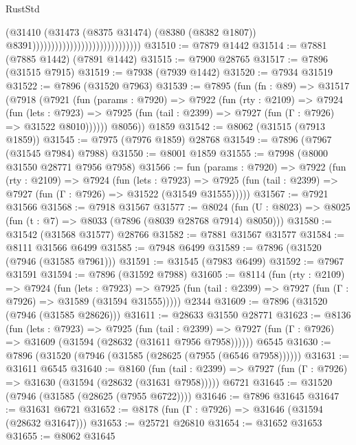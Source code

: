 \begin{lexlean}{RustStd}
\begin{coremodule}
                                                          (@31410
                                                            (@31473
                                                              (@8375 @31474)
                                                              (@8380 (@8382 @1807))
                                                              @8391)))))))))))))))))))))))))))))
@31510 := @7879 @1442
@31514 := @7881 (@7885 @1442) (@7891 @1442)
@31515 := @7900 @28765
@31517 := @7896 (@31515 @7915)
@31519 := @7938 (@7939 @1442)
@31520 := @7934 @31519
@31522 := @7896 (@31520 @7963)
@31539 := @7895
    (fun (fn : @89) =>
    @31517
      (@7918
        (@7921
          (fun (params : @7920) =>
          @7922
            (fun (rty : @2109) =>
            @7924
              (fun (lets : @7923) =>
              @7925 (fun (tail : @2399) => @7927 (fun (Γ : @7926) => @31522 @8010))))))
        @8056))
    @1859
@31542 := @8062 (@31515 (@7913 @1859))
@31545 := @7975 (@7976 @1859) @28768
@31549 := @7896 (@7967 (@31545 @7984) @7988)
@31550 := @8001 @1859
@31555 := @7998 (@8000 @31550 @28771 @7956 @7958)
@31566 := fun (params : @7920) =>
  @7922
    (fun (rty : @2109) =>
    @7924
      (fun (lets : @7923) =>
      @7925 (fun (tail : @2399) => @7927 (fun (Γ : @7926) => @31522 (@31549 @31555)))))
@31567 := @7921 @31566
@31568 := @7918 @31567
@31577 := @8024
    (fun (U : @8023) => @8025 (fun (t : @7) => @8033 (@7896 (@8039 @28768 @7914) @8050)))
@31580 := @31542 (@31568 @31577) @28766
@31582 := @7881 @31567 @31577
@31584 := @8111 @31566 @6499
@31585 := @7948 @6499
@31589 := @7896 (@31520 (@7946 (@31585 @7961)))
@31591 := @31545 (@7983 @6499)
@31592 := @7967 @31591
@31594 := @7896 (@31592 @7988)
@31605 := @8114
    (fun (rty : @2109) =>
    @7924
      (fun (lets : @7923) =>
      @7925 (fun (tail : @2399) => @7927 (fun (Γ : @7926) => @31589 (@31594 @31555)))))
    @2344
@31609 := @7896 (@31520 (@7946 (@31585 @28626)))
@31611 := @28633 @31550 @28771
@31623 := @8136
    (fun (lets : @7923) =>
    @7925
      (fun (tail : @2399) =>
      @7927 (fun (Γ : @7926) => @31609 (@31594 (@28632 (@31611 @7956 @7958))))))
    @6545
@31630 := @7896 (@31520 (@7946 (@31585 (@28625 (@7955 (@6546 @7958))))))
@31631 := @31611 @6545
@31640 := @8160
    (fun (tail : @2399) => @7927 (fun (Γ : @7926) => @31630 (@31594 (@28632 (@31631 @7958)))))
    @6721
@31645 := @31520 (@7946 (@31585 (@28625 (@7955 @6722))))
@31646 := @7896 @31645
@31647 := @31631 @6721
@31652 := @8178 (fun (Γ : @7926) => @31646 (@31594 (@28632 @31647)))
@31653 := @25721 @26810
@31654 := @31652 @31653
@31655 := @8062 @31645

\end{coremodule}
\end{lexlean}
